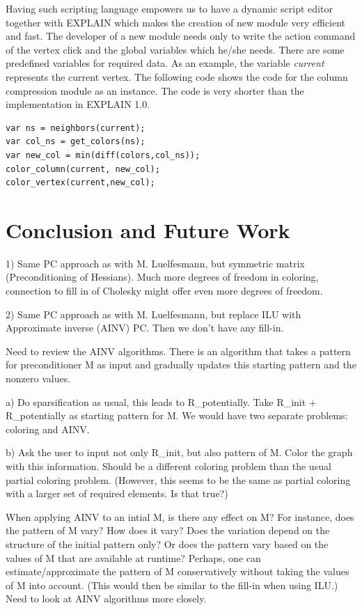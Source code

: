 \documentclass[12pt, oneside]{book}
\begin{document}
Having such scripting language empowers us to have a dynamic script editor 
together with EXPLAIN which makes the creation of new module very efficient and fast.
The developer of a new module needs only to write the action command of the vertex
click and the global variables which he/she needs.
There are some predefined variables for required data.
As an example, the variable \textit{current} represents the current vertex.
The following code shows the code for the column compression 
module as an instance. The code is very shorter than the implementation in EXPLAIN 1.0.
\begin{lstlisting}
var ns = neighbors(current);
var col_ns = get_colors(ns);
var new_col = min(diff(colors,col_ns));
color_column(current, new_col);
color_vertex(current,new_col);
\end{lstlisting}
\chapter{Conclusion and Future Work}
﻿1) Same PC approach as with M. Luelfesmann, but symmetric matrix
(Preconditioning of Hessians). Much more degrees of freedom in
coloring, connection to fill in of Cholesky might offer even more
degrees of freedom.

2) Same PC approach as with M. Luelfesmann, but replace ILU with
Approximate inverse (AINV) PC. Then we don't have any fill-in.

Need to review the AINV algorithms. There is an algorithm that
takes a pattern for preconditioner M as input and gradually updates
this starting pattern and the nonzero values.

a) Do sparsification as usual, this leads to R\_potentially. Take
R\_init + R\_potentially as starting pattern for M. We would have two
separate problems: coloring and AINV.

b) Ask the user to input not only R\_init, but also pattern of M.
Color the graph with this information. Should be a different
coloring problem than the usual partial coloring problem. (However,
this seems to be the same as partial coloring with a larger set of
required elements. Is that true?)

When applying AINV to an intial M, is there any effect on M? For
instance, does the pattern of M vary? How does it vary? Does the
variation depend on the structure of the initial pattern only? Or
does the pattern vary based on the values of M that are available
at runtime? Perhaps, one can estimate/approximate the pattern of M
conservatively without taking the values of M into account. (This
would then be similar to the fill-in when using ILU.) Need to look
at AINV algorithms more closely.
\end{document}
